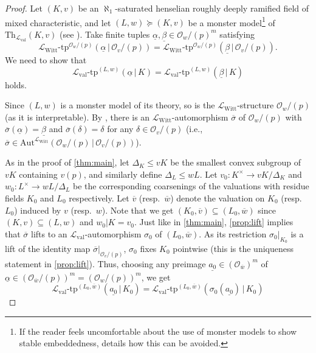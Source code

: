 \documentclass[a4paper]{amsart}
\theoremstyle{mystyle2}
\theoremstyle{mystyle}
\renewcommand{\vec}[1]{\underline{#1}}
\renewcommand{\L}{\mathcal{L}}
\newcommand{\Lval}{\L_{\mathrm{val}}}
\newcommand{\LWitt}{\L_{\mathrm{Witt}}}
\renewcommand{\O}{\mathcal{O}}
\numberwithin{equation}{section}
\begin{document}
    \begin{proof}
        Let $(K,v)$ be an $\aleph_1$-saturated 
        henselian roughly deeply ramified field of mixed characteristic,
        and let $(L,w) \succeq (K,v)$ be a 
        monster model\footnote{If the reader feels uncomfortable about the use of monster models to show stable embeddedness, \cite[Section 3]{HK23} details how this can be avoided.} of $\mathrm{Th}_{\Lval}(K,v)$ (see \cite[Theorem 6.1.7]{TZ}).
        Take finite tuples $\vec{\alpha}, \vec{\beta} \in \O_w/(p)^m$ 
        satisfying 
        $${\LWitt}\textrm{-}\mathrm{tp}^{\O_w/(p)}(\vec{\alpha}\,|\,\O_v/(p)) = {\LWitt}\textrm{-}\mathrm{tp}^{\O_w/(p)}(\vec{\beta}\,|\,\O_v/(p)).$$ 
        We need to show that
        $${\Lval}\textrm{-}\mathrm{tp}^{(L,w)}(\vec{\alpha}\,|\,K) = \Lval\textrm{-}\mathrm{tp}^{(L,w)}(\vec{\beta}\,|\,K) $$
        holds.

        Since $(L,w)$ is a monster model of its theory, 
        so is the $\LWitt$-structure $\O_w/(p)$ (as it is interpretable). 
        By \cite[Corollary 6.1.8]{TZ}, there
        is an $\LWitt$-automorphism $\overline{\sigma}$ of $\O_w/(p)$ with $\overline{\sigma}(\vec{\alpha})=\vec{\beta}$ and $\overline{\sigma}(\delta)=\delta$ for any $\delta \in \O_v/(p)$ 
        (i.e., $\overline\sigma \in \mathrm{Aut}^{\LWitt}(\O_w/(p) \,|\, \O_v/(p))$).

        As in the proof of \cref{thm:main}, let $\Delta_K\leq vK$ be the smallest convex subgroup of $vK$ containing $v(p)$, and similarly define $\Delta_L\leq wL$.
        Let $v_0\colon K^\times\to vK / \Delta_K$ and $w_0\colon L^\times\to wL / \Delta_L$ be the corresponding coarsenings of the valuations with residue fields $K_0$ and $L_0$
        respectively. Let $\overline{v}$ (resp.~$\overline{w}$) denote the valuation on $K_0$ (resp.~$L_0$)
        induced by $v$ (resp.~$w$). 
        Note that we get $(K_0,\overline{v}) \subseteq (L_0,\overline{w})$ since \((K,v)\subseteq(L,w)\) and \(w_0|K=v_0\).
        Just like in \cref{thm:main}, \cref{prop:lift} implies that $\overline{\sigma}$ lifts to an $\Lval$-automorphism 
        $\sigma_0$ of
        $(L_0,\overline{w})$. As its restriction $\sigma_0|_{K_0}$
        is a lift of the identity map $\overline{\sigma}|_{\O_v/(p)}$, $\sigma_0$ fixes
        $K_0$ pointwise (this is the uniqueness statement in \cref{prop:lift}).
        Thus, choosing any preimage $\vec{a_0} \in (\O_{\overline{w}})^m$ of $\vec{\alpha} \in (\O_{\overline{w}}/(p))^m =
        (\O_w/(p))^m$,
        we get
        \begin{equation}
            {\Lval}\textrm{-}\mathrm{tp}^{(L_0,\overline{w})}(\vec{a_0}\,|\,K_0) = \Lval\textrm{-}\mathrm{tp}^{(L_0,\overline{w})}(\sigma_0(\vec{a_0})\,|\,K_0) \label{eq:res} 
        \end{equation}


\end{proof}
\end{document}
